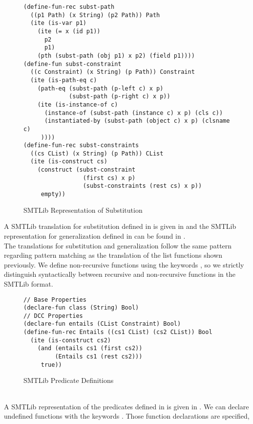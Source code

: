\begin{figure}[t]
\begin{lstlisting}[language=smtlib]
(define-fun-rec subst-path
  ((p1 Path) (x String) (p2 Path)) Path
  (ite (is-var p1)
    (ite (= x (id p1))
      p2
      p1)
    (pth (subst-path (obj p1) x p2) (field p1))))
(define-fun subst-constraint
  ((c Constraint) (x String) (p Path)) Constraint
  (ite (is-path-eq c)
    (path-eq (subst-path (p-left c) x p)
             (subst-path (p-right c) x p))
    (ite (is-instance-of c)
      (instance-of (subst-path (instance c) x p) (cls c))
      (instantiated-by (subst-path (object c) x p) (clsname c)
     ))))
(define-fun-rec subst-constraints
  ((cs CList) (x String) (p Path)) CList
  (ite (is-construct cs)
    (construct (subst-constraint
                 (first cs) x p)
                 (subst-constraints (rest cs) x p))
     empty))
\end{lstlisting}
\caption{SMTLib Representation of Substitution}
\label{fig:smtlib-funs-subst}
\end{figure}
A SMTLib translation for substitution defined in 
is given in 
and the SMTLib representation for generalization
defined in  can be found in .\\
The translations for substitution and generalization
follow the same pattern regarding pattern matching
as the translation of the list functions shown previously.
We define non-recursive functions using the keywords ,
so we strictly distinguish syntactically between recursive
and non-recursive functions in the SMTLib format.
%
\begin{figure}[h]
\begin{lstlisting}[language=smtlib]
// Base Properties
(declare-fun class (String) Bool)
// DCC Properties
(declare-fun entails (CList Constraint) Bool)
(define-fun-rec Entails ((cs1 CList) (cs2 CList)) Bool
  (ite (is-construct cs2)
    (and (entails cs1 (first cs2))
         (Entails cs1 (rest cs2)))
     true))
\end{lstlisting}
\caption{SMTLib Predicate Definitions}
\label{fig:smtlib-predicates}
\end{figure}\\
A SMTLib representation of the predicates defined in 
is given in .
We can declare undefined functions with the keywords .
Those function declarations are specified,
